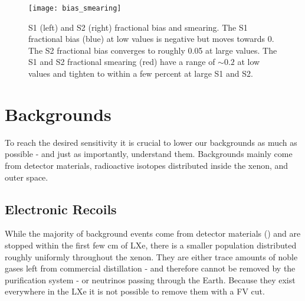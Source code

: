 \begin{figure}
\centering
\texttt{[image: bias\_smearing]}
\caption[S1 and S2 fractional bias and smearing.]{S1 (left) and S2 (right) fractional bias and smearing.  The S1 fractional bias (blue) at
low values is negative but moves towards
0.  The S2 fractional bias converges to roughly 0.05 at large values.  The S1 and S2 fractional smearing (red) have a range of ${\sim}0.2$
at low values and tighten to within a few percent at large S1 and S2.}
\label{fig:det_char_bias_smearing_s1_s1}
\end{figure}



\section{Backgrounds}
\label{sec:backgrounds}
To reach the desired sensitivity it is crucial to lower our backgrounds as much as possible - and just as importantly, understand
them.  Backgrounds mainly come from detector materials, radioactive isotopes distributed inside the xenon, and outer space.



\subsection{Electronic Recoils}
\label{subsec:backgrounds_electronic}
While the majority of background events come from detector materials () and are stopped
within the
first few cm of LXe, there is a smaller population distributed roughly uniformly throughout the xenon.  They are either trace amounts
of noble gases left from commercial distillation - and therefore cannot be removed by the purification system - or neutrinos passing
through the Earth.  Because they exist everywhere in the LXe it is not possible to remove them with a FV cut.



